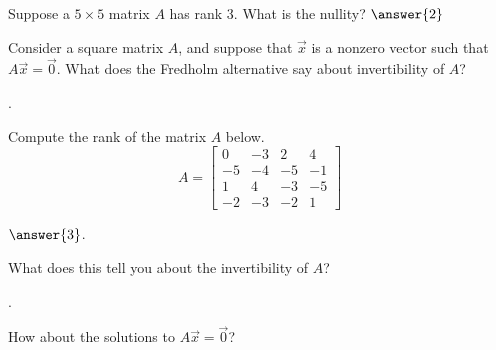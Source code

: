\documentclass{ximera}
\begin{document}
\begin{exercise}
    Suppose a $5 \times 5$ matrix $A$ has rank 3.  What is the nullity? $\answer{2}$
\end{exercise}

\begin{exercise}
    Consider a square matrix $A$, and suppose that $\vec{x}$ is a nonzero vector such that $A \vec{x} = \vec{0}$.  What does the Fredholm alternative say about invertibility of $A$?\\
    \begin{multipleChoice}
        . 
    \end{multipleChoice}
\end{exercise}

\begin{exercise}%
    Compute the rank of the matrix $A$ below.
    \[ A =  \begin{bmatrix} 0 & -3 & 2 & 4 \\ -5 & -4 &-5 & -1 \\ 1&4&-3 & -5\\ -2 & -3 &-2&1\end{bmatrix} \]
    
    $\answer{3}$.
    \begin{problem}
        What does this tell you about the invertibility of $A$? 
        \begin{multipleChoice}
            . 
        \end{multipleChoice}
        \begin{problem}
            How about the solutions to $A\vec{x} = \vec{0}$? 
            \begin{multipleChoice}
            \end{multipleChoice}
        \end{problem}
    \end{problem}
\end{exercise}
\end{document}

